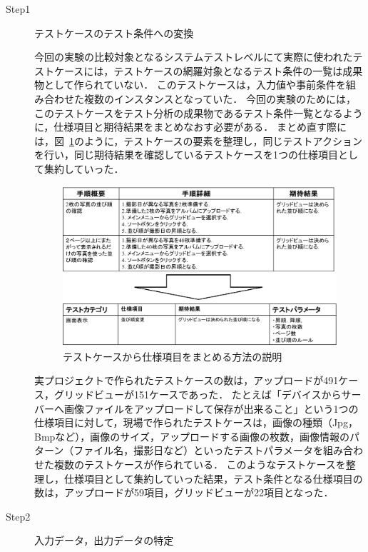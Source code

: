 \begin{description}

\item[Step1] テストケースのテスト条件への変換


今回の実験の比較対象となるシステムテストレベルにて実際に使われたテストケースには，テストケースの網羅対象となるテスト条件の一覧は成果物として作られていない．
このテストケースは，入力値や事前条件を組み合わせた複数のインスタンスとなっていた．
今回の実験のためには，このテストケースをテスト分析の成果物であるテスト条件一覧となるように，仕様項目と期待結果をまとめなおす必要がある．
まとめ直す際には，図~\ref{fig:D-4-Fig8}のように，テストケースの要素を整理し，同じテストアクションを行い，同じ期待結果を確認しているテストケースを1つの仕様項目として集約していった．

\begin{figure}[htbp]
\begin{center}
\includegraphics[width=12cm]{./image/D-4-Fig8.png}
\caption{テストケースから仕様項目をまとめる方法の説明}
\label{fig:D-4-Fig8}
\end{center}
\end{figure}

実プロジェクトで作られたテストケースの数は，アップロードが491ケース，グリッドビューが151ケースであった．
たとえば「デバイスからサーバーへ画像ファイルをアップロードして保存が出来ること」という1つの仕様項目に対して，現場で作られたテストケースは，画像の種類（Jpg，Bmpなど），画像のサイズ，アップロードする画像の枚数，画像情報のパターン（ファイル名，撮影日など）といったテストパラメータを組み合わせた複数のテストケースが作られている．
このようなテストケースを整理し，仕様項目として集約していった結果，テスト条件となる仕様項目の数は，アップロードが59項目，グリッドビューが22項目となった．


\item[Step2] 入力データ，出力データの特定


\end{description}
